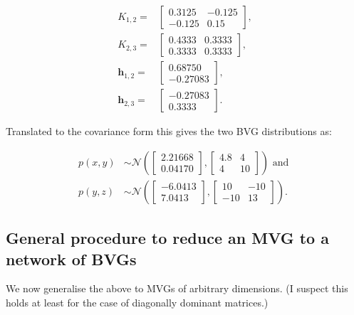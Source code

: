 \begin{align*}
K_{1,2}= & \left[\begin{array}{cc}
0.3125 & -0.125\\
-0.125 & 0.15
\end{array}\right],\\
K_{2,3}= & \left[\begin{array}{cc}
0.4333 & 0.3333\\
0.3333 & 0.3333
\end{array}\right],\\
\mathbf{h}_{1,2}= & \left[\begin{array}{c}
0.68750\\
-0.27083
\end{array}\right],\\
\mathbf{h}_{2,3}= & \left[\begin{array}{c}
-0.27083\\
0.3333
\end{array}\right].
\end{align*}


Translated to the covariance form this gives the two BVG distributions
as:

\begin{align*}
p(x,y) & \sim\mathcal{N}\left(\left[\begin{array}{c}
2.21668\\
0.04170
\end{array}\right],\left[\begin{array}{cr}
4.8 & 4\\
4 & 10
\end{array}\right]\right)\mbox{ and }\\
p(y,z) & \sim\mathcal{N}\left(\left[\begin{array}{r}
-6.0413\\
7.0413
\end{array}\right],\left[\begin{array}{rr}
10 & -10\\
-10 & 13
\end{array}\right]\right).
\end{align*}



\subsection{General procedure to reduce an MVG to a network of BVGs}

We now generalise the above to MVGs of arbitrary dimensions. (I suspect
this holds at least for the case of diagonally dominant matrices.)


